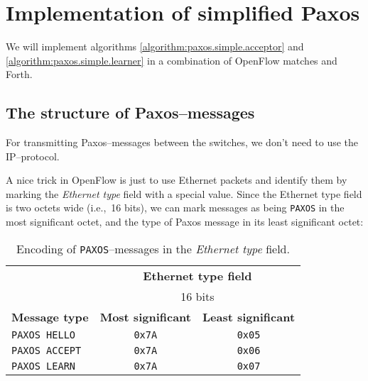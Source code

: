 \chapter{Implementation of simplified Paxos}
\label{implementation.simplified.paxos}

We will implement algorithms \ref{algorithm:paxos.simple.acceptor} 
and \ref{algorithm:paxos.simple.learner} in a combination of OpenFlow
matches and Forth.



\section{The structure of Paxos--messages}

For transmitting Paxos--messages between the switches, we don't need to use
the IP--protocol.

A nice trick in OpenFlow is just to use Ethernet packets
and identify them by marking the \textit{Ethernet type} field with a special value.
Since the Ethernet type field is two octets wide (i.e.,~16 bits), we can
mark messages as being \texttt{PAXOS} in the most significant octet, and the
type of Paxos message in its least significant octet:

\begin{table}[H]
  \centering
  \begin{tabular}{l|c|c|}
    \cline{2-3}
      & \multicolumn{2}{c|}{\textbf{Ethernet type field}} \\
      & \multicolumn{2}{c|}{16 bits} \\

    \hline
      \multicolumn{1}{|l|}{\textbf{Message type}} &
      \textbf{Most significant} &
      \textbf{Least significant} \\

    \hline
      \multicolumn{1}{|l|}{\texttt{PAXOS HELLO}} &
      \texttt{0x7A} &
      \texttt{0x05} \\

    \hline
      \multicolumn{1}{|l|}{\texttt{PAXOS ACCEPT}} &
      \texttt{0x7A} &
      \texttt{0x06} \\

    \hline
      \multicolumn{1}{|l|}{\texttt{PAXOS LEARN}} &
      \texttt{0x7A} &
      \texttt{0x07} \\

    \hline
  \end{tabular}
  \caption{Encoding of \texttt{PAXOS}--messages in the \textit{Ethernet
    type} field.}
  \label{table:paxos.ethernet.type.encoding}
\end{table}


